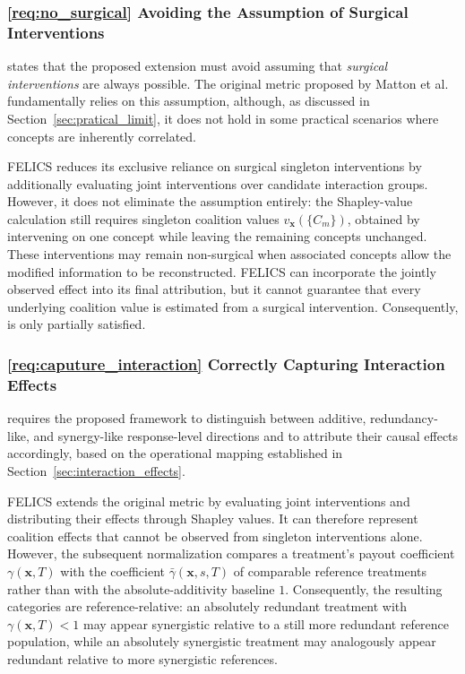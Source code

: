 \subsubsection{\ref{req:no_surgical} Avoiding the Assumption of Surgical Interventions}

 states that the proposed extension must avoid assuming that \emph{surgical interventions} are always possible. The original metric proposed by Matton et al.~\cite{mattonWalkTalkMeasuring2024} fundamentally relies on this assumption, although, as discussed in Section~\ref{sec:pratical_limit}, it does not hold in some practical scenarios where concepts are inherently correlated.

FELICS reduces its exclusive reliance on surgical singleton interventions by additionally evaluating joint interventions over candidate interaction groups. However, it does not eliminate the assumption entirely: the Shapley-value calculation still requires singleton coalition values $v_{\mathbf{x}}(\{C_m\})$, obtained by intervening on one concept while leaving the remaining concepts unchanged. These interventions may remain non-surgical when associated concepts allow the modified information to be reconstructed. FELICS can incorporate the jointly observed effect into its final attribution, but it cannot guarantee that every underlying coalition value is estimated from a surgical intervention. Consequently,  is only partially satisfied.

\subsubsection{\ref{req:caputure_interaction} Correctly Capturing Interaction Effects}

 requires the proposed framework to distinguish between additive, redundancy-like, and synergy-like response-level directions and to attribute their causal effects accordingly, based on the operational mapping established in Section~\ref{sec:interaction_effects}.

FELICS extends the original metric by evaluating joint interventions and distributing their effects through Shapley values. It can therefore represent coalition effects that cannot be observed from singleton interventions alone. However, the subsequent normalization compares a treatment's payout coefficient $\gamma(\mathbf{x},T)$ with the coefficient $\bar\gamma(\mathbf{x},s,T)$ of comparable reference treatments rather than with the absolute-additivity baseline $1$. Consequently, the resulting categories are reference-relative: an absolutely redundant treatment with $\gamma(\mathbf{x},T)<1$ may appear synergistic relative to a still more redundant reference population, while an absolutely synergistic treatment may analogously appear redundant relative to more synergistic references.


